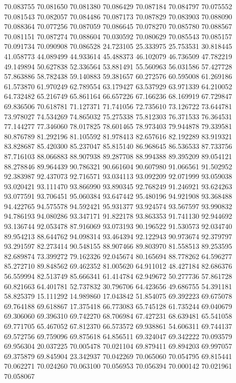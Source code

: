 70.083755
70.081650
70.081380
70.086429
70.087184
70.084797
70.075552
70.081543
70.082057
70.084486
70.087173
70.087829
70.083903
70.088090
70.088364
70.077256
70.087059
70.086645
70.078270
70.085780
70.088567
70.081151
70.087274
70.088604
70.030592
70.080629
70.085543
70.085157
70.091734
70.090908
70.086528
24.723105
25.333975
25.753531
30.818445
41.058773
44.089499
44.933614
45.488373
46.102079
46.736509
47.782219
49.149894
50.627838
52.336564
53.881491
55.560963
56.031586
57.427728
57.863886
58.782438
59.140883
59.381657
60.272576
60.595008
61.269186
61.573870
61.970249
62.789554
63.179427
63.537929
63.971339
64.210052
64.732482
65.216749
65.861164
66.657226
67.166236
68.169919
67.729847
69.836506
70.618781
71.127371
71.741056
72.735610
73.126722
73.644781
73.978027
74.534269
74.865032
75.275338
75.812303
76.371533
76.364531
77.144277
77.346060
78.017825
78.601465
78.973403
79.944878
79.339581
80.876789
81.292196
81.105592
81.978413
82.657616
82.192289
83.919321
83.828687
85.420300
85.237047
85.815140
86.968645
86.536533
87.733756
87.716103
88.066883
88.907938
89.287708
88.994388
89.395209
89.054121
88.278846
89.964439
90.786321
90.661604
90.607980
91.066561
91.502952
92.383987
92.437073
92.716571
93.034113
93.092209
92.071999
93.059038
93.020421
93.111470
93.866990
93.890345
92.768249
91.246921
93.624263
93.077591
93.706451
95.060384
93.647442
95.480196
94.921908
93.368488
94.422765
94.575578
94.592421
95.931377
93.924574
93.567597
93.990832
94.786193
94.080286
93.347171
91.822178
93.863353
91.741130
92.944692
93.136744
92.053478
87.916069
93.073193
90.196522
91.530573
92.034740
89.954213
88.644762
94.098314
93.464394
92.122943
90.973674
92.379797
93.291597
82.273414
90.548155
88.907466
89.803970
81.558513
89.253595
82.689874
73.399272
79.162326
92.045674
80.165694
88.778262
64.596277
85.272710
89.848562
69.462352
81.005620
64.911012
48.427184
82.686376
56.559994
82.513749
85.666341
61.414784
62.949672
50.277736
57.861728
60.821663
64.401781
52.737832
30.796706
64.423656
49.686755
54.391181
58.825379
15.111292
14.989860
17.043842
51.854075
69.392223
69.675078
69.764188
69.618867
17.375418
66.773083
65.745128
61.735244
69.040679
69.306060
69.396310
69.742270
68.706984
67.427231
68.639481
65.541058
69.771705
65.467052
67.812370
66.573572
69.938861
54.606311
69.744137
69.572756
69.759096
69.875618
64.856511
69.324047
69.342222
70.093579
69.956304
20.037225
70.005478
70.021104
69.879411
69.894203
69.997057
69.375879
69.845904
23.342937
70.042269
70.065060
70.054795
69.815441
70.062271
70.024260
70.063100
70.056953
70.056394
70.000142
70.021961
70.058067
